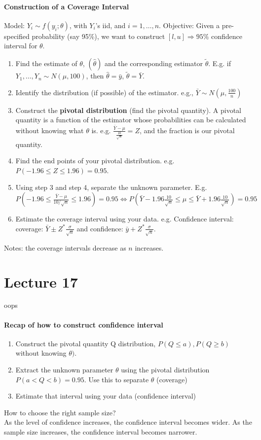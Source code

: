 \documentclass[10pt,letter]{article}
\theoremstyle{plain}
\theoremstyle{definition}
\begin{document}
\paragraph{Construction of a Coverage Interval}
Model: $Y_i\sim f(y_i;\theta)$, with $Y_i$'s iid, and $i=1,\ldots,n$. Objective: Given a pre-specified probability (say 95\%), we want to construct $[l,u]\Rightarrow95\%$ confidence interval for $\theta$. \begin{enumerate}
    \item Find the estimate of $\theta$, $(\hat{\theta})$ and the corresponding estimator $\tilde{\theta}$. E.g. if $Y_1,\ldots,Y_n\sim N(\mu,100)$, then $\hat{\theta}=\bar{y}$, $\tilde{\theta}=\bar{Y}$. 
    \item Identify the distribution (if possible) of the estimator. e.g., $\bar{Y}\sim N\left(\mu,\frac{100}{n}\right)$ 
    \item Construct the \textbf{pivotal distribution} (find the pivotal quantity). A pivotal quantity is a function of the estimator whose probabilities can be calculated without knowing what $\theta$ is. e.g. $\frac{\bar{Y}-\mu}{\frac{10}{\sqrt{n}}}=Z$, and the fraction is our pivotal quantity. 
    \item Find the end points of your pivotal distribution. e.g. $P(-1.96\leq Z\leq1.96)=0.95$. 
    \item Using step 3 and step 4, separate the unknown parameter. E.g. $P\left(-1.96\leq\frac{\bar{Y}-\mu}{10/\sqrt{n}}\leq1.96\right)=0.95\Leftrightarrow P\left(\bar{Y}-1.96\frac{10}{\sqrt{n}}\leq\mu\leq\bar{Y}+1.96\frac{10}{\sqrt{n}}\right)=0.95$
    \item Estimate the coverage interval using your data. e.g. Confidence interval: coverage: $\bar{Y}\pm Z^*\frac{\sigma}{\sqrt{n}}$ and confidence: $\bar{y}+Z^*\frac{\sigma}{\sqrt{n}}$. 
\end{enumerate}
Notes: the coverage intervals decrease as $n$ increases. 



\section*{Lecture 17}
oops
\paragraph{Recap of how to construct confidence interval}
\begin{enumerate}
    \item Construct the pivotal quantity Q distribution, $P(Q\leq a), P(Q\geq b)$ without knowing $\theta)$. 
    \item Extract the unknown parameter $\theta$ using the pivotal distribution $P(a<Q<b)=0.95$. Use this to separate $\theta$ (coverage)
    \item Estimate that interval using your data (confidence interval)
\end{enumerate}
How to choose the right sample size?  \\ 
As the level of confidence increases, the confidence interval becomes wider. As the sample size increases, the confidence interval becomes narrower. 
\end{document}
